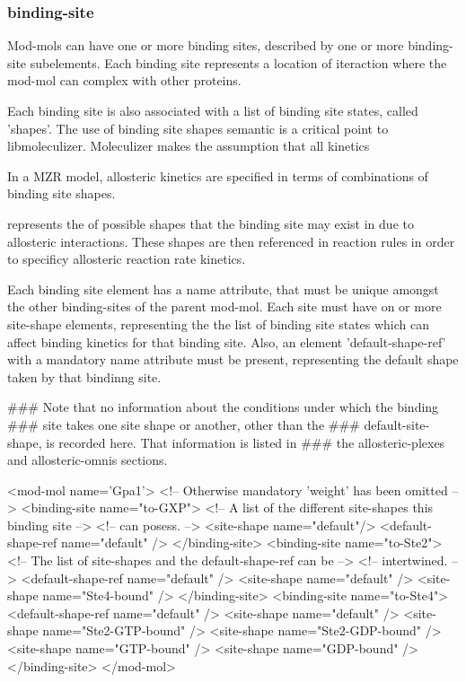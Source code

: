 \subsubsection{binding-site}
Mod-mols can have one or more binding sites, described by one or
more binding-site subelements.  Each binding site represents a 
location of iteraction where the mod-mol can complex with other proteins.

Each binding site is also associated with a list of binding
site states, called 'shapes'.  The use of binding site shapes
semantic is a critical point to libmoleculizer.  Moleculizer makes the
assumption that all kinetics

In a MZR model,
allosteric kinetics are specified in terms of 
combinations of binding site shapes.   




represents the  of possible shapes that the binding site may exist
in due to allosteric interactions.  These shapes are then referenced
in reaction rules in order to specificy allosteric reaction rate
kinetics.   

Each binding site element has a name attribute, that must be unique
amongst the other binding-sites of the parent mod-mol.
Each site must have on or more site-shape elements, representing the
the list of binding site states which can affect binding kinetics for
that binding site.  Also, an element 'default-shape-ref' with a
mandatory name attribute must be present, representing the default shape
taken by that bindinng site.  


### Note that no information about the conditions under which the binding
### site takes one site shape or another, other than the
### default-site-shape, is recorded here.  That information is listed in
### the allosteric-plexes and allosteric-omnis sections.

<mod-mol name='Gpa1'>
  <!-- Otherwise mandatory 'weight' has been omitted --> 
  <binding-site name="to-GXP">
    <!-- A list of the different site-shapes this binding site -->
    <!-- can posess.  -->
    <site-shape name="default"/>
    <default-shape-ref name="default" />
  </binding-site>
  <binding-site name="to-Ste2">
    <!-- The list of site-shapes and the default-shape-ref can be -->
    <!-- intertwined.  -->
    <default-shape-ref name="default" />
    <site-shape name="default" />
    <site-shape name="Ste4-bound" />
  </binding-site>
  <binding-site name="to-Ste4">
    <default-shape-ref name="default" />
    <site-shape name="default" />
    <site-shape name="Ste2-GTP-bound" />
    <site-shape name="Ste2-GDP-bound" />
    <site-shape name="GTP-bound" />
    <site-shape name="GDP-bound" />
  </binding-site>
</mod-mol>


